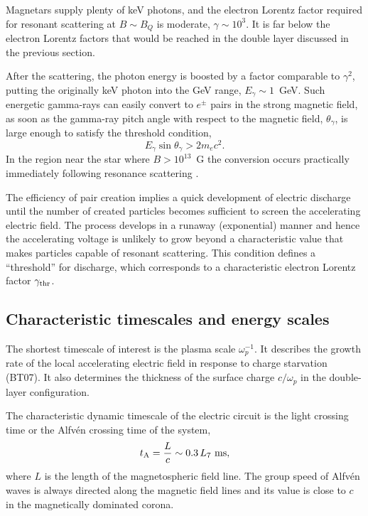 Magnetars supply plenty of keV photons, and the electron Lorentz factor required
for resonant scattering at $B\sim B_Q$ is moderate, $\gamma \sim 10^{3}$. It is
far below the electron Lorentz factors that would be reached in the double layer
discussed in the previous section.

After the scattering, the photon energy is boosted by a factor comparable to
$\gamma^2$, putting the originally keV photon into the GeV range, $E_\gamma\sim
1$~GeV. Such energetic gamma-rays can easily convert to $e^{\pm}$ pairs in the
strong magnetic field, as soon as the gamma-ray pitch angle with respect to the
magnetic field, $\theta_\gamma$, is large enough to satisfy the threshold
condition,
\begin{equation}
  \label{eq:threshold}
  E_\gamma\sin\theta_\gamma > 2m_{e}c^2.
\end{equation}
In the region near the star where $B>10^{13}$~G the conversion occurs practically
immediately following resonance scattering \citep{beloborodov_mechanism_2013}.

The efficiency of pair creation implies a quick development of electric discharge
until the number of created particles becomes sufficient to screen the accelerating
electric field. The process develops in a runaway (exponential) manner and hence
the accelerating voltage is unlikely to grow beyond a characteristic value that
makes particles capable of resonant scattering. This condition defines a ``threshold''
for discharge, which corresponds to a characteristic electron Lorentz factor $\gamma_{\rm thr}$.


\subsection{Characteristic timescales and energy scales}


The shortest timescale of interest is the plasma scale $\omega_p^{-1}$. It
describes the growth rate of the local accelerating electric field in response
to charge starvation (BT07). It also determines the thickness of the surface
charge $c/\omega_p$ in the double-layer configuration.

The characteristic dynamic timescale of the electric circuit is the light crossing
time or the Alfv\'en crossing time of the system,
\begin{equation}
   t_{\rm A}= \frac{L}{c}\sim 0.3\,L_7 {\rm~ms},
\end{equation}
where $L$ is the length of the magnetospheric field line. The group speed of Alfv\'en
waves is always directed along the magnetic field lines and its value is close to $c$
in the magnetically dominated corona.

